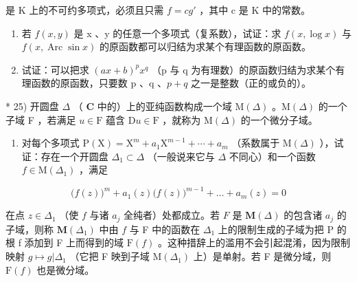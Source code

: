 是 K 上的不可约多项式，必须且只需 \(f = cg'\) ，其中 c 是 K 中的常数。

\begin{enumerate}
\def\labelenumi{\arabic{enumi})}
\setcounter{enumi}{22}
\item
  若 \(f(x, y)\) 是 x 、y 的任意一个多项式（复系数），试证：求 \(f(x, \log x)\) 与 \(f(x, \operatorname{Arc} \sin x)\) 的原函数都可以归结为求某个有理函数的原函数。
\item
  试证：可以把求 \((ax + b)^{p} x^{q}\) （p 与 q 为有理数）的原函数归结为求某个有理函数的原函数，只要数 p 、q 、\(p + q\) 之一是整数（正的或负的）。
\end{enumerate}

* 25) 开圆盘 \(\Delta\) （ \(\mathbf{C}\) 中的）上的亚纯函数构成一个域 \(\mathrm{M}(\Delta)\) 。\(\mathrm{M}(\Delta)\) 的一个子域 F ，若满足 \(u \in \mathrm{F}\) 蕴含 \(\mathrm{D}u \in \mathrm{F}\) ，就称为 \(\mathrm{M}(\Delta)\) 的一个微分子域。

\begin{enumerate}
\def\labelenumi{\alph{enumi})}
\tightlist
\item
  对每个多项式 \(\mathrm{P}(\mathrm{X})=\mathrm{X}^{m}+a_{1}\mathrm{X}^{m-1}+\cdots+a_{m}\) （系数属于 \(\mathrm{M}(\Delta)\) ），试证：存在一个开圆盘 \(\Delta_{1}\subset\Delta\) （一般说来它与 \(\Delta\) 不同心）和一个函数 \(f\in\mathrm{M}(\Delta_{1})\) ，满足
\end{enumerate}

\[
\Big (f (z) \Big) ^ {m} + a _ {1} (z) \Big (f (z) \Big) ^ {m - 1} + \dots + a _ {m} (z) = 0
\]

在点 \(z \in \Delta_1\) （使 \(f\) 与诸 \(a_j\) 全纯者）处都成立。若 \(F\) 是 \(\mathbf{M}(\Delta)\) 的包含诸 \(a_j\) 的子域，则称 \(\mathbf{M}(\Delta_1)\) 中由 \(f\) 与 F 中的函数在 \(\Delta_{1}\) 上的限制生成的子域为把 P 的根 f 添加到 F 上而得到的域 \(\mathrm{F}(f)\) 。这种措辞上的滥用不会引起混淆，因为限制映射 \(g \mapsto g|\Delta_{1}\) （它把 F 映到子域 \(\mathrm{M}(\Delta_{1})\) 上）是单射。若 F 是微分域，则 \(\mathrm{F}(f)\) 也是微分域。

